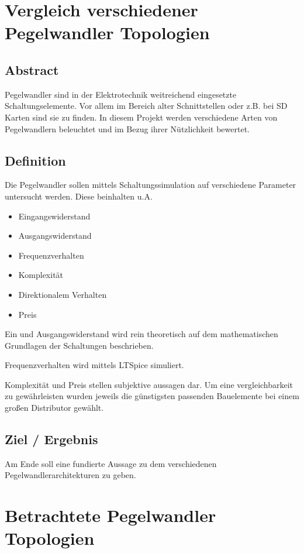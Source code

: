 \section{Vergleich verschiedener Pegelwandler Topologien 
}\label{sec:proj-title-long}

\subsection{Abstract
}\label{subsec:proj-abstract}

Pegelwandler sind in der Elektrotechnik weitreichend eingesetzte Schaltungselemente.
Vor allem im Bereich alter Schnittstellen oder z.B. bei SD Karten sind sie zu finden.
In diesem Projekt werden verschiedene Arten von Pegelwandlern beleuchtet und im Bezug ihrer Nützlichkeit bewertet.

\subsection{Definition
}\label{subsec:proj-def}

Die Pegelwandler sollen mittels Schaltungssimulation auf verschiedene Parameter untersucht werden.
Diese beinhalten u.A. 
\begin{itemize}
  \item Eingangswiderstand
  \item Ausgangswiderstand
  \item Frequenzverhalten
  \item Komplexität
  \item Direktionalem Verhalten
  \item Preis
\end{itemize}

Ein und Ausgangswiderstand wird rein theoretisch auf dem mathematischen Grundlagen der Schaltungen beschrieben.

Frequenzverhalten wird mittels LTSpice simuliert.

Komplexität und Preis stellen subjektive aussagen dar. Um eine vergleichbarkeit zu gewährleisten wurden jeweils die günstigsten passenden Bauelemente bei einem großen Distributor gewählt.



\subsection{Ziel / Ergebnis
}\label{subsec:proj-target}

Am Ende soll eine fundierte Aussage zu dem verschiedenen Pegelwandlerarchitekturen zu geben.

\newpage
\section{Betrachtete Pegelwandler Topologien}\label{sec:pegel-topo}

\newpage

\newpage

\newpage







